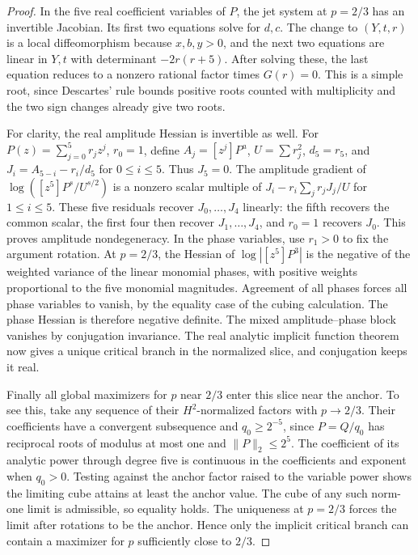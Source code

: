 \documentclass[11pt]{article}
\begin{document}
\begin{proof}
In the five real coefficient variables of \(P\), the jet system
at \(p=2/3\) has an invertible Jacobian. Its first two
equations solve for \(d,c\). The change to \((Y,t,r)\) is a
local diffeomorphism because \(x,b,y>0\), and the next two
equations are linear in \(Y,t\) with determinant \(-2r(r+5)\).
After solving these, the last equation reduces to a nonzero
rational factor times \(G(r)=0\). This is a simple root,
since Descartes' rule bounds positive roots counted with
multiplicity and the two sign changes already give two roots.

For clarity, the real amplitude Hessian is invertible as well.
For \(P(z)=\sum_{j=0}^5r_jz^j\), \(r_0=1\), define
\(A_j=[z^j]P^a\), \(U=\sum r_j^2\), \(d_5=r_5\),
and \(J_i=A_{5-i}-r_i/d_5\) for \(0\le i\le5\).
Thus \(J_5=0\). The amplitude gradient of
\(\log([z^5]P^s/U^{s/2})\) is a nonzero scalar multiple of
\(J_i-r_i\sum_j r_jJ_j/U\) for \(1\le i\le5\).
These five residuals recover \(J_0,\ldots,J_4\) linearly:
the fifth recovers the common scalar, the first four then
recover \(J_1,\ldots,J_4\), and \(r_0=1\) recovers \(J_0\).
This proves amplitude nondegeneracy. In the phase variables,
use \(r_1>0\) to fix the argument rotation. At \(p=2/3\),
the Hessian of \(\log|[z^5]P^3|\) is the negative of the weighted
variance of the linear monomial phases, with positive weights
proportional to the five monomial magnitudes. Agreement of all
phases forces all phase variables to vanish, by the equality
case of the cubing calculation. The phase Hessian is therefore
negative definite. The mixed amplitude--phase block vanishes
by conjugation invariance. The real analytic implicit function
theorem now gives a unique critical branch in the normalized
slice, and conjugation keeps it real.

Finally all global maximizers for \(p\) near \(2/3\) enter this
slice near the anchor. To see this, take any sequence of their
\(H^2\)-normalized factors with \(p\to2/3\).
Their coefficients have a convergent subsequence and
\(q_0\ge 2^{-5}\), since \(P=Q/q_0\) has reciprocal roots of
modulus at most one and \(\|P\|_2\le 2^5\).
The coefficient of its analytic power through degree five is
continuous in the coefficients and exponent when \(q_0>0\).
Testing against the anchor factor raised to the variable power
shows the limiting cube attains at least the anchor value.
The cube of any such norm-one limit is admissible, so equality
holds. The uniqueness at \(p=2/3\) forces the limit after rotations
to be the anchor. Hence only the implicit critical branch
can contain a maximizer for \(p\) sufficiently close to \(2/3\).
\end{proof}
\end{document}
